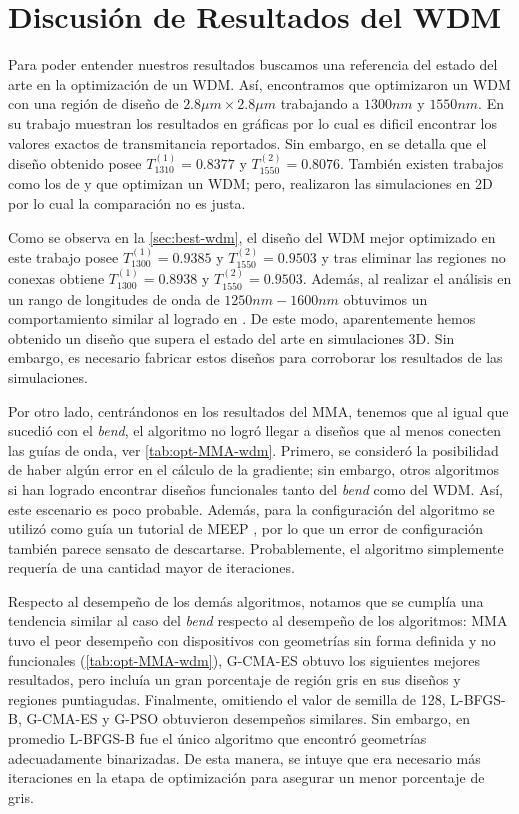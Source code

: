 \section{Discusión de Resultados del WDM}

Para poder entender nuestros resultados buscamos una referencia del estado del arte en la optimización
de un WDM. Así, encontramos que 
\cite{Piggott2015} optimizaron un WDM con una región de diseño de $2.8 \mu m \times 2.8 \mu m$
trabajando a $1300 nm$ y $1550 nm$. En su trabajo muestran los resultados en gráficas por lo cual
es dificil encontrar los valores exactos de transmitancia reportados. Sin embargo, en
\cite{Sigmund2016} se detalla que el diseño obtenido posee 
$T_{1310}^{(1)} = 0.8377$ y $T_{1550}^{(2)} = 0.8076$.
También existen trabajos como los de \cite{Christiansen2021} y \cite{Zhang2021} que optimizan
un WDM; pero, realizaron las simulaciones en 2D por lo cual la comparación no es justa.

Como se observa en la \autoref{sec:best-wdm}, el diseño del WDM mejor optimizado en este trabajo posee $T_{1300}^{(1)} = 0.9385$ y 
$T_{1550}^{(2)} = 0.9503$ y tras eliminar las regiones no conexas obtiene
$T_{1300}^{(1)} = 0.8938$ y $T_{1550}^{(2)} = 0.9503$. Además, al realizar el análisis
en un rango de longitudes de onda de $1250nm-1600nm$ obtuvimos un comportamiento similar
al logrado en \cite{Piggott2015}.
De este modo, aparentemente hemos obtenido un diseño que supera el estado del arte en
simulaciones 3D.
Sin embargo, es necesario fabricar estos diseños para corroborar los resultados de las simulaciones.

Por otro lado, centrándonos en los resultados del MMA, tenemos que al igual que sucedió con el \emph{bend},
el algoritmo no logró llegar a diseños que al menos conecten las guías de onda, 
ver \autoref{tab:opt-MMA-wdm}.
Primero, se consideró la posibilidad de haber algún error en el cálculo de la gradiente;
sin embargo, otros algoritmos si han logrado encontrar diseños funcionales tanto del
\emph{bend} como del WDM. Así, este escenario es poco probable.
Además, para la configuración del algoritmo se utilizó como guía un tutorial de MEEP \citep{Oskooi2010},
por lo que un error de configuración también parece sensato de descartarse.
Probablemente, el algoritmo simplemente requería de una cantidad mayor de iteraciones.

Respecto al desempeño de los demás algoritmos, notamos que se cumplía una tendencia similar
al caso del \emph{bend} respecto al desempeño de los algoritmos: MMA tuvo el peor
desempeño con dispositivos con geometrías sin forma definida y no funcionales
(\autoref{tab:opt-MMA-wdm}), G-CMA-ES obtuvo los siguientes mejores resultados,
pero incluía un gran porcentaje de región gris en sus diseños y regiones puntiagudas.
Finalmente, omitiendo el valor de semilla de 128, L-BFGS-B, G-CMA-ES y G-PSO obtuvieron
desempeños similares.
Sin embargo, en promedio L-BFGS-B fue el único algoritmo que encontró geometrías
adecuadamente binarizadas. De esta manera, se intuye que era necesario más iteraciones
en la etapa de optimización para asegurar un menor porcentaje de gris.

